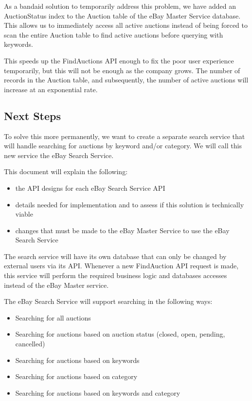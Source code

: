 \documentclass[12pt,a4paper]{article}
\begin{document}
As a bandaid solution to temporarily address this problem, we have added an 
AuctionStatus index to the Auction table of the eBay Master Service database.
This allows us to immediately access all active auctions instead of being forced 
to scan the entire Auction table to find active auctions before querying with keywords. 

\vspace{\baselineskip}
This speeds up the FindAuctions API enough to fix the poor user experience
temporarily, but this will not be enough as the company grows. The number of
records in the Auction table, and subsequently, the number of active auctions
will increase at an exponential rate.

\subsection{Next Steps}
To solve this more permanently, we want to create a separate search service
that will handle searching for auctions by keyword and/or category. 
We will call this new service the eBay Search Service. 

\vspace{\baselineskip}
This document will explain the following:

\begin{itemize}
    \item the API designs for each eBay Search Service API
    \item details needed for implementation and to assess if this solution is technically viable
    \item changes that must be made to the eBay Master Service to use the eBay Search Service
\end{itemize} 

\vspace{\baselineskip}
The search service will have its own database that can only be changed
by external users via its API. Whenever a new FindAuction API request is made, 
this service will perform the required business logic and databases accesses 
instead of the eBay Master service.

The eBay Search Service  will support searching in the following ways:

\begin{itemize}
    \item Searching for all auctions
    \item Searching for auctions based on auction status (closed, open, pending, cancelled)
    \item Searching for auctions based on keywords
    \item Searching for auctions based on category
    \item Searching for auctions based on keywords and category
\end{itemize}
\end{document}
